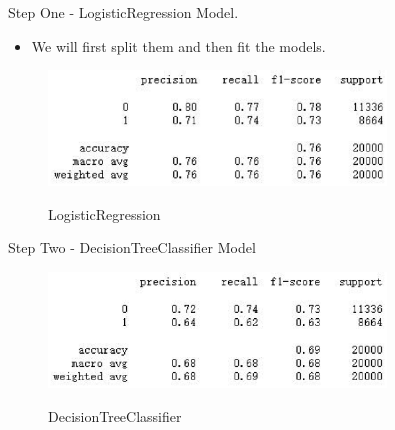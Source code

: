 \documentclass[
size=14pt,
paper=smartboard,  %
mode=present, 		%
display=slides, 	%
style=tuliplab,  	%
pauseslide,
fleqn,leqno]{powerdot}
\begin{document}
	
	\begin{slide}[toc=,bm=]{Step One - LogisticRegression Model.}
		\begin{itemize}
			\item
			\smallskip
			We will first split them and then fit the models.
		\end{itemize}
		\begin{figure}
			\centering
			\includegraphics[width=0.8\textwidth]{figures//fig7.eps}\\
			\caption{LogisticRegression}
		\end{figure}
	\end{slide}
	
	
	\begin{slide}[toc=,bm=]{Step Two - DecisionTreeClassifier Model}
		\begin{figure}
			\centering
			\includegraphics[width=0.8\textwidth]{figures//fig8.eps}\\
			\caption{DecisionTreeClassifier}
		\end{figure}
	\end{slide}
	
\end{document}
